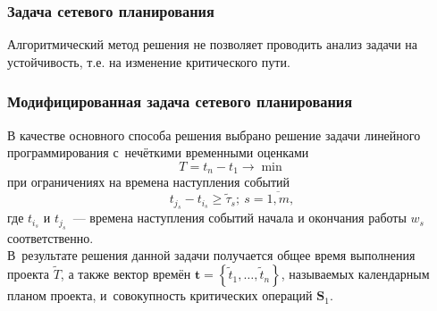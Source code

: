 \documentclass[12pt]{beamer}
\begin{document}
\begin{frame}
  \frametitle{Задача сетевого планирования}
  Алгоритмический метод решения не позволяет проводить анализ задачи на устойчивость, т.е. на изменение критического пути.\\

\end{frame}

\begin{frame}
  \frametitle{Модифицированная задача сетевого планирования}
  В качестве основного способа решения выбрано решение задачи линейного программирования с~нечёткими временными оценками
  \begin{equation}
  \label{eq:crisp-lp-cpm-task}
    T=t_n-t_1 \to \min
  \end{equation}
  при ограничениях на времена наступления событий
  \begin{equation}
  \label{eq:crisp-lp-cpm-restrictions}
    t_{j_s}-t_{i_s}\geqslant \tilde \tau_s;\ s=\overline{1,m},
  \end{equation}
  где $t_{i_s}$ и $t_{j_s}$~--- времена наступления событий начала и окончания работы $w_s$ соответственно. \\
  В~результате решения данной задачи получается общее время выполнения проекта $\tilde T$, а также вектор времён $\mathbf{t}=\left\{\tilde t_1, \ldots, \tilde t_n \right\}$, называемых календарным планом проекта, и~совокупность критических операций $\mathbf{S}_1$.
\end{frame}
\end{document}

